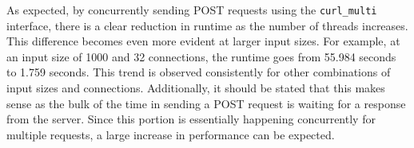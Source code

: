 \documentclass[12pt,reqno]{article}
\begin{document}
As expected, by concurrently sending POST requests using the \texttt{curl\_multi} interface, there is a clear reduction in runtime as the number of threads increases. This difference becomes even more evident at larger input sizes. For example, at an input size of 1000 and 32 connections, the runtime goes from 55.984 seconds to 1.759 seconds. This trend is observed consistently for other combinations of input sizes and connections. Additionally, it should be stated that this makes sense as the bulk of the time in sending a POST request is waiting for a response from the server. Since this portion is essentially happening concurrently for multiple requests, a large increase in performance can be expected.

\clearpage
\pagebreak
\end{document}
